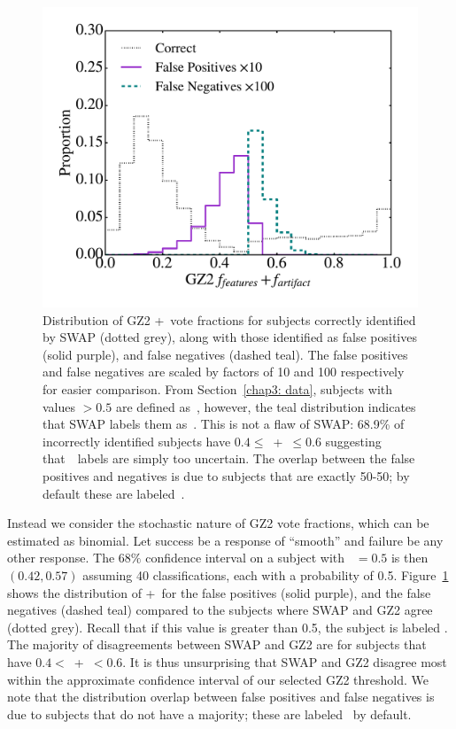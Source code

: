 \begin{figure}
\centering
\includegraphics[width=5in]{Figures/human_machine/f8.pdf}
\caption[SWAP's prediction disagrees with the GZ2 label as a result of the confidence interval around the chosen threshold used to define the GZ2 label.]{Distribution of GZ2 \ffeat+\fstar~vote fractions for subjects correctly identified by SWAP (dotted grey), along with those identified as false positives (solid purple), and false negatives (dashed teal). 
The false positives and false negatives are scaled by factors of 10 and 100 respectively for easier comparison. From Section~\ref{chap3: data}, subjects with values $> 0.5$ are defined as~\feat, however, the teal distribution indicates that SWAP labels them as~\notfeat. This is not a flaw of SWAP: 68.9\% of incorrectly identified subjects have $0.4 \le $~\ffeat +\fstar~$ \le 0.6$ suggesting that~\raw~labels are simply too uncertain. The overlap between the false positives and negatives is due to subjects that are exactly 50-50; by default these are labeled~\notfeat.}
\label{fig: SWAP sucks}
\end{figure}

Instead we consider the stochastic nature of GZ2 vote fractions, which can be estimated as binomial. Let success be a response of ``smooth'' and failure be any other response. The $68\%$ confidence interval on a subject with \fsmooth~$=0.5$ is then $(0.42, 0.57)$ assuming 40 classifications, each with a probability of 0.5. Figure~\ref{fig: SWAP sucks} shows the distribution of \ffeat+\fstar~for the false positives (solid purple), and the false negatives (dashed teal) compared to the  subjects where SWAP and GZ2 agree (dotted grey).  Recall that if this value is greater than 0.5, the subject is labeled \feat. The majority of disagreements between SWAP and GZ2 are for subjects that have $0.4 <$~\ffeat+\fstar~$< 0.6$. It is thus unsurprising that SWAP and GZ2 disagree most within the approximate confidence interval of our selected GZ2 threshold. We note that the distribution overlap between false positives and false negatives is due to subjects that do not have a majority; these are labeled \notfeat~by default. 

